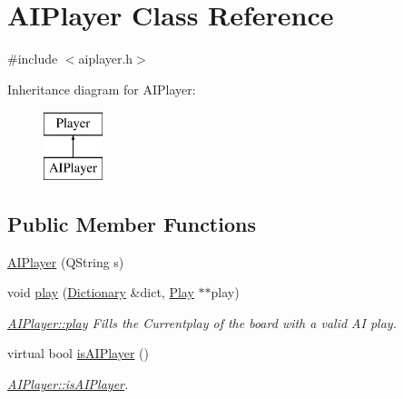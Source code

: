 \hypertarget{class_a_i_player}{\section{A\-I\-Player Class Reference}
\label{class_a_i_player}
}


{\ttfamily \#include $<$aiplayer.\-h$>$}

Inheritance diagram for A\-I\-Player\-:\begin{figure}[H]
\begin{center}
\leavevmode
\includegraphics[height=2.000000cm]{class_a_i_player}
\end{center}
\end{figure}
\subsection*{Public Member Functions}
\begin{DoxyCompactItemize}
\item 
\hyperlink{class_a_i_player_af228dd97466ff5219f2e150935eb2565}{A\-I\-Player} (Q\-String s)
\item 
void \hyperlink{class_a_i_player_a6641fec98f51924a76ba00b4b3253325}{play} (\hyperlink{class_dictionary}{Dictionary} \&dict, \hyperlink{class_play}{Play} $\ast$$\ast$play)
\begin{DoxyCompactList}\small\item\em \hyperlink{class_a_i_player_a6641fec98f51924a76ba00b4b3253325}{A\-I\-Player\-::play} Fills the Currentplay of the board with a valid A\-I play. \end{DoxyCompactList}\item 
virtual bool \hyperlink{class_a_i_player_a2a71a31297386f4d69f12a43187954a6}{is\-A\-I\-Player} ()
\begin{DoxyCompactList}\small\item\em \hyperlink{class_a_i_player_a2a71a31297386f4d69f12a43187954a6}{A\-I\-Player\-::is\-A\-I\-Player}. \end{DoxyCompactList}\end{DoxyCompactItemize}
